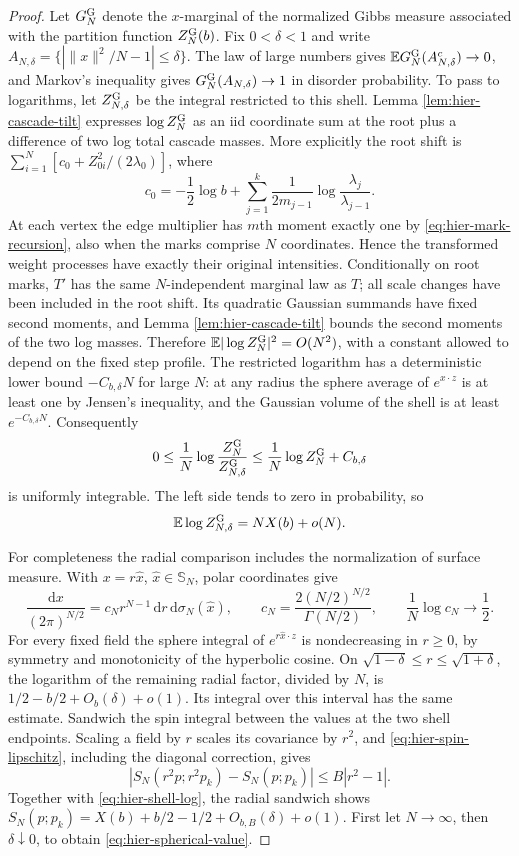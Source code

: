 \documentclass[11pt,a4paper]{article}
\numberwithin{equation}{section}
\theoremstyle{definition}
\theoremstyle{remark}
\newcommand{\E}{\mathbb E}
\newcommand{\dd}{\mathrm d}
\begin{document}
\begin{proof}
Let $G_N^{\rm G}$ denote the $x$-marginal of the normalized Gibbs measure
associated with the partition function $Z_N^{\rm G}(b)$.
Fix $0<\delta<1$ and write
$A_{N,\delta}=\{|\|x\|^2/N-1|\le\delta\}$.  The law of large numbers gives
$\E G_N^{\rm G}(A_{N,\delta}^c)\to0$, and Markov's inequality gives
$G_N^{\rm G}(A_{N,\delta})\to1$ in disorder probability.  To pass to
logarithms, let $Z_{N,\delta}^{\rm G}$ be the integral restricted to this
shell.  Lemma \ref{lem:hier-cascade-tilt} expresses $\log Z_N^{\rm G}$ as
an iid coordinate sum at the root plus a difference of two log total
cascade masses.  More explicitly the root shift is
$\sum_{i=1}^N[c_0+Z_{0i}^2/(2\lambda_0)]$, where
\[
 c_0=-\frac12\log b+
          \sum_{j=1}^k\frac1{2m_{j-1}}\log\frac{\lambda_j}{\lambda_{j-1}}.
\]
At each vertex the edge multiplier has $m$th moment exactly one by
\eqref{eq:hier-mark-recursion}, also when the marks comprise $N$
coordinates.  Hence the transformed weight processes have exactly their
original intensities.  Conditionally on root marks, $T'$ has the same
$N$-independent marginal law as $T$; all scale changes have been included
in the root shift.  Its quadratic Gaussian summands have fixed second
moments, and Lemma \ref{lem:hier-cascade-tilt} bounds the second moments of
the two log masses.  Therefore
$\E|\log Z_N^{\rm G}|^2=O(N^2)$, with a constant allowed to depend on the
fixed step profile.  The restricted logarithm has a
deterministic lower bound $-C_{b,\delta}N$ for large $N$: at any radius the
sphere average of $e^{x\cdot z}$ is at least one by Jensen's inequality,
and the Gaussian volume of the shell is at least $e^{-C_{b,\delta}N}$.
Consequently
\[
 0\le\frac1N\log\frac{Z_N^{\rm G}}{Z_{N,\delta}^{\rm G}}
 \le\frac1N\log Z_N^{\rm G}+C_{b,\delta}
\]
is uniformly integrable.  The left side tends to zero in probability, so
\begin{equation}
 \E\log Z_{N,\delta}^{\rm G}=NX(b)+o(N).
 \label{eq:hier-shell-log}
\end{equation}

For completeness the radial comparison includes the normalization of
surface measure.  With $x=r\widehat x$, $\widehat x\in\mathbb S_N$, polar
coordinates give
\[
 \frac{\dd x}{(2\pi)^{N/2}}
 =c_N r^{N-1}\,\dd r\,\dd\sigma_N(\widehat x),
 \qquad c_N=\frac{2(N/2)^{N/2}}{\Gamma(N/2)},
 \qquad \frac1N\log c_N\longrightarrow\frac12.
\]
For every fixed field the sphere integral of $e^{r\widehat x\cdot z}$ is
nondecreasing in $r\ge0$, by symmetry and monotonicity of the hyperbolic
cosine.  On $\sqrt{1-\delta}\le r\le\sqrt{1+\delta}$, the logarithm of the
remaining radial factor, divided by $N$, is
$1/2-b/2+O_b(\delta)+o(1)$.  Its integral over this interval has the same
estimate.  Sandwich the spin integral between the values at the two shell
endpoints.  Scaling a field by $r$ scales its covariance by $r^2$, and
\eqref{eq:hier-spin-lipschitz}, including the diagonal correction, gives
\[
 |S_N(r^2p;r^2p_k)-S_N(p;p_k)|\le B|r^2-1|.
\]
Together with \eqref{eq:hier-shell-log}, the radial sandwich shows
$S_N(p;p_k)=X(b)+b/2-1/2+O_{b,B}(\delta)+o(1)$.  First let $N\to\infty$,
then $\delta\downarrow0$, to obtain \eqref{eq:hier-spherical-value}.


\end{proof}
\end{document}
